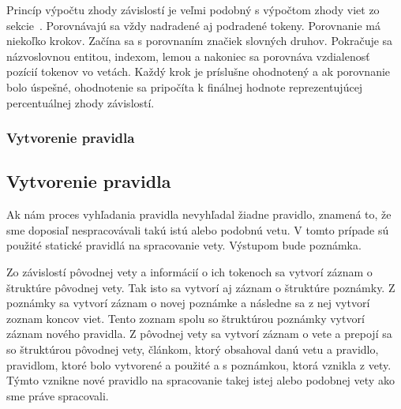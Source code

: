Princíp výpočtu zhody závislostí je veľmi podobný s výpočtom zhody viet zo sekcie~. Porovnávajú sa vždy nadradené aj podradené tokeny. Porovnanie má niekoľko krokov. Začína sa s porovnaním značiek slovných druhov. Pokračuje sa názvoslovnou entitou, indexom, lemou a nakoniec sa porovnáva vzdialenosť pozícií tokenov vo vetách. Každý krok je príslušne ohodnotený a ak porovnanie bolo úspešné, ohodnotenie sa pripočíta k finálnej hodnote reprezentujúcej percentuálnej zhody závislostí.

%
%
{
	\subsubsection{Vytvorenie pravidla}
}
{
	\subsection{Vytvorenie pravidla}
}
\label{subsubsection:rule_creation}
Ak nám proces vyhľadania pravidla nevyhľadal žiadne pravidlo, znamená to, že sme doposiaľ nespracovávali takú istú alebo podobnú vetu. V tomto prípade sú použité statické pravidlá na spracovanie vety. Výstupom bude poznámka.

Zo závislostí pôvodnej vety a informácií o ich tokenoch sa vytvorí záznam o štruktúre pôvodnej vety. Tak isto sa vytvorí aj záznam o štruktúre poznámky. Z poznámky sa vytvorí záznam o novej poznámke a následne sa z nej vytvorí zoznam koncov viet. Tento zoznam spolu so štruktúrou poznámky vytvorí záznam nového pravidla. Z pôvodnej vety sa vytvorí záznam o vete a prepojí sa so štruktúrou pôvodnej vety, článkom, ktorý obsahoval danú vetu a pravidlo, pravidlom, ktoré bolo vytvorené a použité a s poznámkou, ktorá vznikla z vety. Týmto vznikne nové pravidlo na spracovanie takej istej alebo podobnej vety ako sme práve spracovali.


